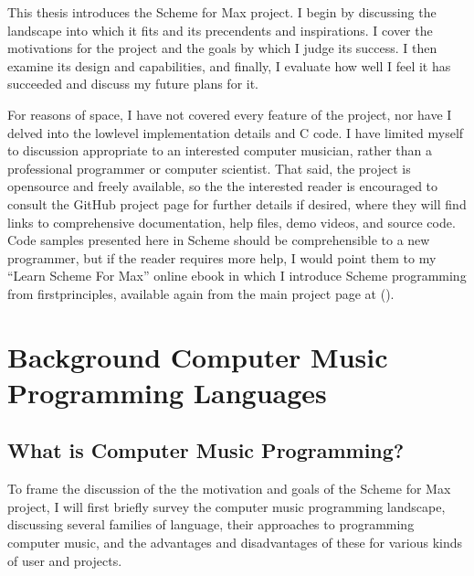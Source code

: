 \documentclass[letterpaper,10pt,english]{sphinxmanual}
\begin{document}
\sphinxAtStartPar
This thesis introduces the Scheme for Max project. I begin by discussing the landscape into which it fits
and its precendents and inspirations. I cover the motivations for the project and the goals by which
I judge its success. I then examine its design and capabilities, and finally, I evaluate
how well I feel it has succeeded and discuss my future plans for it.

\sphinxAtStartPar
For reasons of space, I have not covered every feature of the project, nor have I delved into the
low\sphinxhyphen{}level implementation details and C code. I have limited myself to discussion appropriate
to an interested computer musician, rather than a professional programmer or computer scientist.
That said, the project is open\sphinxhyphen{}source and freely available, so the
the interested reader is encouraged to consult the GitHub project page for further details if desired,
where they will find links to comprehensive documentation, help files, demo videos, and source code.
Code samples presented here in Scheme should be comprehensible to a new programmer,
but if the reader requires more help, I would point them to my “Learn Scheme For Max” online
e\sphinxhyphen{}book in which I introduce Scheme programming from first\sphinxhyphen{}principles, available again
from the main project page at ().

\sphinxstepscope


\chapter{Background \sphinxhyphen{} Computer Music Programming Languages}
\label{\detokenize{background:background-computer-music-programming-languages}}\label{\detokenize{background::doc}}

\section{What is Computer Music Programming?}
\label{\detokenize{background:what-is-computer-music-programming}}
\sphinxAtStartPar
To frame the discussion of the the motivation and goals of the Scheme for Max project, I will
first briefly survey the computer music programming landscape, discussing several families of
language, their approaches to programming computer music, and the advantages and disadvantages of these
for various kinds of user and projects.
\end{document}
